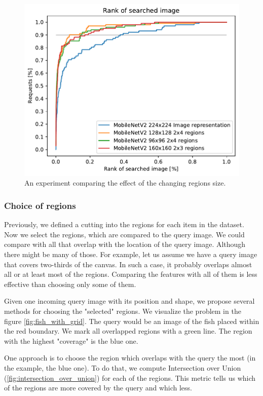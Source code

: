 \begin{figure}
\centering
\includegraphics[width=0.8\linewidth]{graphs/901175c0015f71987720d10953133afa566d88a09a6d7182a074859ff4e8409e.pdf}
\caption{An experiment comparing the effect of the changing regions size.}
\label{fig:different_region_size}
\end{figure}


\subsubsection{Choice of regions}

Previously, we defined a cutting into the regions for each item in the dataset. Now we select the regions, which are compared to the query image. We could compare with all that overlap with the location of the query image. Although there might be many of those. For example, let us assume we have a query image that covers two-thirds of the canvas. In such a case, it probably overlaps almost all or at least most of the regions. Comparing the features with all of them is less effective than choosing only some of them.

Given one incoming query image with its position and shape, we propose several methods for choosing the "selected" regions. We visualize the problem in the figure \ref{fig:fish_with_grid}. The query would be an image of the fish placed within the red boundary. We mark all overlapped regions with a green line. The region with the highest "coverage" is the blue one.

One approach is to choose the region which overlaps with the query the most (in the example, the blue one). To do that, we compute Intersection over Union (\ref{fig:intersection_over_union}) for each of the regions. This metric tells us which of the regions are more covered by the query and which less.

